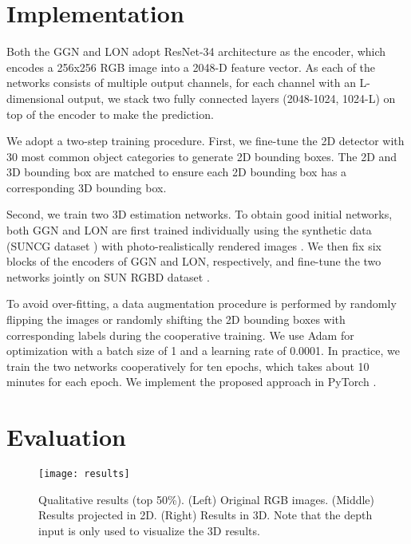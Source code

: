 \documentclass{article}
\begin{document}
\setlength\abovecaptionskip{0pt}
\setlength\belowcaptionskip{0pt}

\section{Implementation}

Both the GGN and LON adopt ResNet-34 \citep{he2016deep} architecture as the encoder, which encodes a 256x256 RGB image into a 2048-D feature vector. As each of the networks consists of multiple output channels, for each channel with an L-dimensional output, we stack two fully connected layers (2048-1024, 1024-L) on top of the encoder to make the prediction.

We adopt a two-step training procedure. First, we fine-tune the 2D detector \citep{dai2017deformable,bodla2017softnms} with 30 most common object categories to generate 2D bounding boxes. The 2D and 3D bounding box are matched to ensure each 2D bounding box has a corresponding 3D bounding box.

Second, we train two 3D estimation networks. To obtain good initial networks, both GGN and LON are first trained individually using the synthetic data (SUNCG dataset \citep{song2017semantic}) with photo-realistically rendered images \cite{zhang2017physically}. We then fix six blocks of the encoders of GGN and LON, respectively, and fine-tune the two networks jointly on SUN RGBD dataset \citep{song2015sun}.

To avoid over-fitting, a data augmentation procedure is performed by randomly flipping the images or randomly shifting the 2D bounding boxes with corresponding labels during the cooperative training. We use Adam \citep{kingma2014adam} for optimization with a batch size of 1 and a learning rate of 0.0001. In practice, we train the two networks cooperatively for ten epochs, which takes about 10 minutes for each epoch. We implement the proposed approach in PyTorch \citep{paszke2017automatic}.

\section{Evaluation}

\begin{figure}[t!]
    \begin{center}
        \texttt{[image: results]}
    \end{center}
    \caption{Qualitative results (top 50\%). (Left) Original RGB images. (Middle) Results projected in 2D. (Right) Results in 3D. Note that the depth input is only used to visualize the 3D results.}
    \label{fig:results}
\end{figure}
\end{document}
